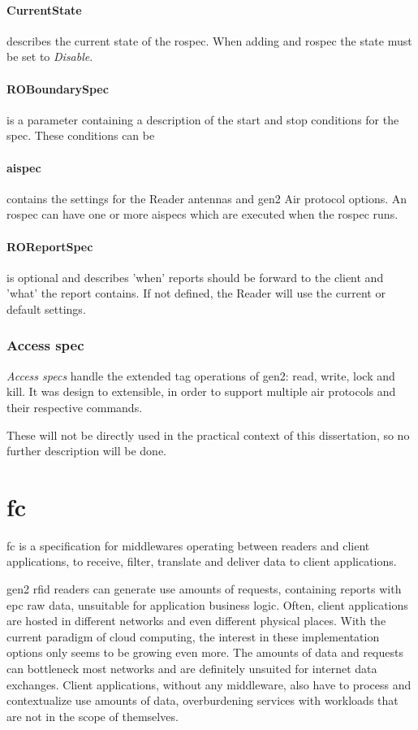 \paragraph{CurrentState} describes the current state of the \ac{rospec}. When adding and \ac{rospec} the state must be set to \emph{Disable}.

\paragraph{ROBoundarySpec} is a parameter containing a description of the start and stop conditions for the \ac{spec}. These conditions can be

\paragraph{\ac{aispec}} contains the settings for the Reader antennas and \ac{gen2} Air protocol options. An \ac{rospec} can have one or more \acp{aispec} which are executed when the \ac{rospec} runs.

\paragraph{ROReportSpec} is optional and describes 'when' reports should be forward to the client and 'what' the report contains. If not defined, the Reader will use the current or default settings.

\subsubsection{Access \ac{spec}}

\emph{Access \acp{spec}} handle the extended tag operations of \ac{gen2}: read, write, lock and kill.
It was design to extensible, in order to support multiple air protocols and their respective commands.

These will not be directly used in the practical context of this dissertation, so no further description will be done.

\section{\acf{fc}}

\ac{fc} is a specification for middlewares operating between readers and client applications, to receive, filter, translate and deliver data to client applications.

\ac{gen2} \ac{rfid} readers can generate use amounts of requests, containing reports with \ac{epc} raw data, unsuitable for application business logic.
Often, client applications are hosted in different networks and even different physical places. With the current paradigm of cloud computing, the interest in these implementation options only seems to be growing even more.
The amounts of data and requests can bottleneck most networks and are definitely unsuited for internet data exchanges.
Client applications, without any middleware, also have to process and contextualize use amounts of data, overburdening services with workloads that are not in the scope of themselves.

